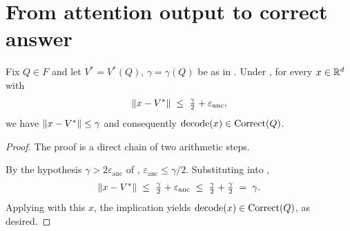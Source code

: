 \section{From attention output to correct answer}
\label{sec:decoding}

\begin{lemma}\label{lem:decoding_correctness}
Fix $Q \in F$ and let $V^* = V^*(Q)$, $\gamma = \gamma(Q)$ be as in
. Under
, for every
$x \in \mathbb{R}^d$ with
\begin{align}\label{eq:decoding_close_hypothesis}
   \left\| x - V^* \right\| \;\le\; \tfrac{\gamma}{2} + \varepsilon_{\mathrm{anc}},
\end{align}
we have $\left\| x - V^* \right\| \le \gamma$ and consequently
$\operatorname{decode}(x) \in \operatorname{Correct}(Q)$.
\end{lemma}

\begin{proof}
The proof is a direct chain of two arithmetic steps.

By the hypothesis $\gamma > 2 \varepsilon_{\mathrm{anc}}$
of ,
$\varepsilon_{\mathrm{anc}} \le \gamma/2$.
Substituting into ,
\begin{align*}
   \left\| x - V^* \right\|
   \;\le\;
   \tfrac{\gamma}{2} + \varepsilon_{\mathrm{anc}}
   \;\le\;
   \tfrac{\gamma}{2} + \tfrac{\gamma}{2}
   \;=\;
   \gamma.
\end{align*}
Applying  with this $x$, the implication
 yields $\operatorname{decode}(x) \in \operatorname{Correct}(Q)$, as desired.
\end{proof}
